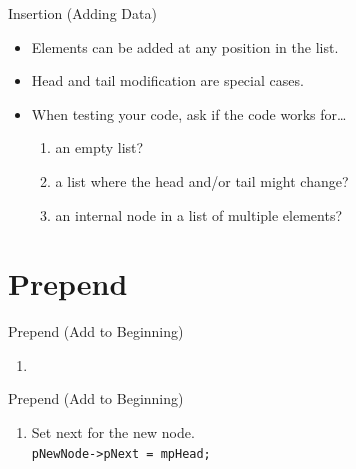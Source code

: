 \documentclass[14pt,aspectratio=1610, hyperref={pdfpagelayout=SinglePage}]{beamer}
\begin{document}
\begin{frame}{Insertion (Adding Data)}
\begin{itemize}
\item<1->
  Elements can be added at any position in the list.
\item<2->
  Head and tail modification are special cases.
\item<3->
  When testing your code, ask if the code works for\ldots{}
  \begin{enumerate}
  \item
    an empty list?
  \item
    a list where the head and/or tail might change?
  \item
    an internal node in a list of multiple elements?
  \end{enumerate}
\end{itemize}
\end{frame}

\section{Prepend}

\begin{frame}{Prepend (Add to Beginning)}
\begin{enumerate}
\item
\end{enumerate}
\end{frame}

\begin{frame}{Prepend (Add to Beginning)}
\begin{enumerate}\addtocounter{enumi}{1}
\item
  Set next for the new node.\\
  \lstinline{pNewNode->pNext = mpHead;}\\[1em]
\end{enumerate}

\end{frame}
\end{document}
